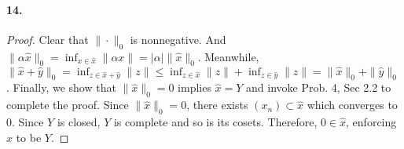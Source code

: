  \paragraph{14.}
  \begin{proof}
    Clear that $\|\cdot\|_0$ is nonnegative. And $\|\alpha\hat{x}\|_0= \inf_{x
    \in\hat{x}}\|\alpha x\| = |\alpha|\|\hat{x}\|_0$. Meanwhile, $\|\hat{x}+
    \hat{y}\|_0=\inf_{z\in\hat{x}+\hat{y}}\|z\|\le\inf_{z\in\hat{x}}\|z\|+
    \inf_{z\in\hat{y}}\|z\|=\|\hat{x}\|_0+\|\hat{y}\|_0$. Finally, we show that
    $\|\hat{x}\|_0=0$ implies $\hat{x}=Y$ and invoke Prob. 4, Sec 2.2 to 
    complete the proof. Since $\|\hat{x}\|_0=0$, there exists $(x_n)\subset
    \hat{x}$ which converges to $0$. Since $Y$ is closed, $Y$ is complete and so
    is its cosets. Therefore, $0\in\hat{x}$, enforcing $\hat{x}$ to be $Y$. 
  \end{proof}
